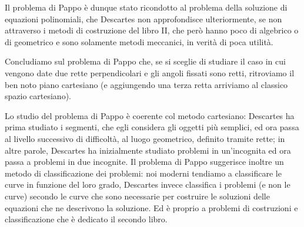 \par Il problema di Pappo \`e dunque stato ricondotto al problema della soluzione di equazioni polinomiali, che Descartes non approfondisce ulteriormente, se non attraverso i metodi di costruzione del libro II, che per\`o hanno poco di algebrico o di geometrico e sono solamente metodi meccanici, in verit\`a di poca utilit\`a.
\par Concludiamo sul problema di Pappo che, se si sceglie di studiare il caso in cui vengono date due rette perpendicolari e gli angoli fissati sono retti, ritroviamo il ben noto piano cartesiano (e aggiungendo una terza retta arriviamo al classico spazio cartesiano).
\par Lo studio del problema di Pappo \`e coerente col metodo cartesiano: Descartes ha prima studiato i segmenti, che egli considera gli oggetti pi\`u semplici, ed ora passa al livello successivo di difficolt\`a, al luogo geometrico, definito tramite rette; in altre parole, Descartes ha inizialmente studiato problemi in un'incognita ed ora passa a problemi in due incognite. Il problema di Pappo suggerisce inoltre un metodo di classificazione dei problemi: noi moderni tendiamo a classificare le curve in funzione del loro grado, Descartes invece classifica i problemi (e non le curve) secondo le curve che sono necessarie per costruire le soluzioni delle equazioni che ne descrivono la soluzione. Ed \`e proprio a problemi di costruzioni e classificazione che \`e dedicato il secondo libro.
